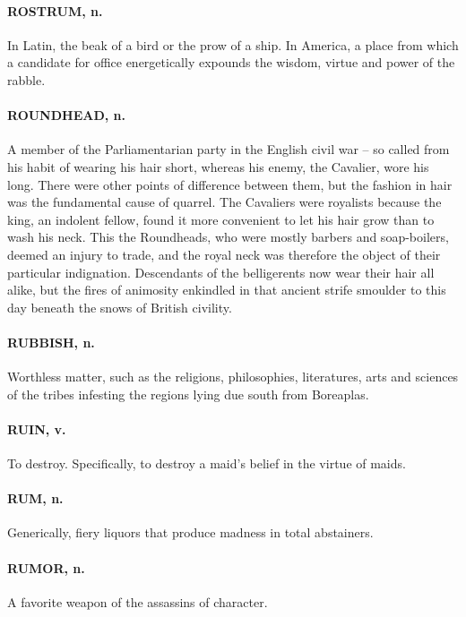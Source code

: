 \documentclass[11pt]{article}
\begin{document}
\paragraph{ROSTRUM, n.}  In Latin, the beak of a bird or the prow of a ship.  In
America, a place from which a candidate for office energetically
expounds the wisdom, virtue and power of the rabble.

\paragraph{ROUNDHEAD, n.}  A member of the Parliamentarian party in the English
civil war -- so called from his habit of wearing his hair short,
whereas his enemy, the Cavalier, wore his long.  There were other
points of difference between them, but the fashion in hair was the
fundamental cause of quarrel.  The Cavaliers were royalists because
the king, an indolent fellow, found it more convenient to let his hair
grow than to wash his neck.  This the Roundheads, who were mostly
barbers and soap-boilers, deemed an injury to trade, and the royal
neck was therefore the object of their particular indignation.
Descendants of the belligerents now wear their hair all alike, but the
fires of animosity enkindled in that ancient strife smoulder to this
day beneath the snows of British civility.

\paragraph{RUBBISH, n.}  Worthless matter, such as the religions, philosophies,
literatures, arts and sciences of the tribes infesting the regions
lying due south from Boreaplas.

\paragraph{RUIN, v.}  To destroy.  Specifically, to destroy a maid's belief in the
virtue of maids.

\paragraph{RUM, n.}  Generically, fiery liquors that produce madness in total
abstainers.

\paragraph{RUMOR, n.}  A favorite weapon of the assassins of character.
\end{document}
